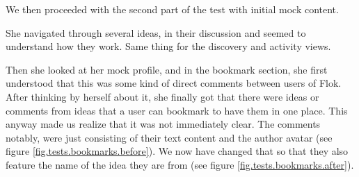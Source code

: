 \documentclass[a4paper,12pt, oneside]{article}
\begin{document}
We then proceeded with the second part of the test with initial mock content.

She navigated through several ideas, in their discussion and seemed to understand how they work.
Same thing for the discovery and activity views.

Then she looked at her mock profile, and in the bookmark section, she first understood that this was some kind of direct comments between users of Flok.
After thinking by herself about it, she finally got that there were ideas or comments from ideas that a user can bookmark to have them in one place.
This anyway made us realize that it was not immediately clear.
The comments notably, were just consisting of their text content and the author avatar (see figure \ref{fig.tests.bookmarks.before}).
We now have changed that so that they also feature the name of the idea they are from (see figure \ref{fig.tests.bookmarks.after}).
\end{document}
